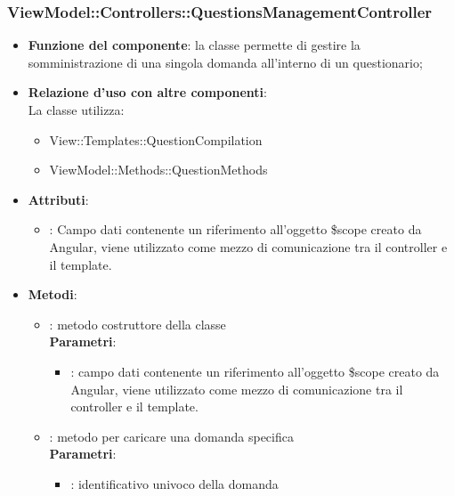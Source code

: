 \subsubsection{ViewModel::Controllers::QuestionsManagementController}
\begin{itemize}
\item\textbf{Funzione del componente}: la classe permette di gestire la somministrazione di una singola domanda all'interno di un questionario;
	\item\textbf{Relazione d'uso con altre componenti}: \\
La classe utilizza:
	\begin{itemize}
		\item View::Templates::QuestionCompilation
		\item ViewModel::Methods::QuestionMethods
	\end{itemize}
\item\textbf{Attributi}:
	\begin{itemize}
		\item{}: Campo dati contenente un riferimento all’oggetto \$scope creato da Angular, viene utilizzato come mezzo di comunicazione tra il controller e il template.\\
	\end{itemize}
\item\textbf{Metodi}:
	\begin{itemize}
		\item{}: metodo costruttore della classe\\
		\textbf{Parametri}:
			\begin{itemize}
				\item{}: campo dati contenente un riferimento all’oggetto \$scope creato da Angular, viene utilizzato come mezzo di comunicazione tra il controller e il template.\\
			\end{itemize}
		\item{}: metodo per caricare una domanda specifica\\
		\textbf{Parametri}:
			\begin{itemize}
				\item{}: identificativo univoco della domanda\\
			\end{itemize}
	\end{itemize}
\end{itemize}

